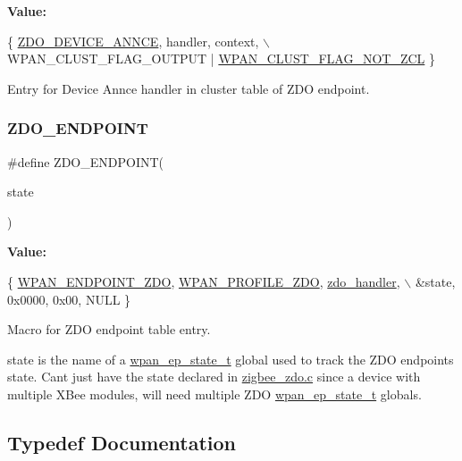 {\bfseries Value\+:}
\begin{DoxyCode}
\{ \hyperlink{group__zdo_gaffd566d5fc7aa21973fd7e5e026db30a}{ZDO\_DEVICE\_ANNCE}, handler, context, \(\backslash\)
                     WPAN\_CLUST\_FLAG\_OUTPUT | \hyperlink{group__wpan__aps_gacb0e365a8c5e72ee90be503513e7e630}{WPAN\_CLUST\_FLAG\_NOT\_ZCL} \}
\end{DoxyCode}


Entry for Device Annce handler in cluster table of Z\+DO endpoint. 

\mbox{\label{group__zdo_gaef7118e478f5ad9949dcd23f6e0901c9}} 
\subsubsection{\texorpdfstring{Z\+D\+O\+\_\+\+E\+N\+D\+P\+O\+I\+NT}{ZDO\_ENDPOINT}}
{\footnotesize\ttfamily \#define Z\+D\+O\+\_\+\+E\+N\+D\+P\+O\+I\+NT(\begin{DoxyParamCaption}\item[{}]{state }\end{DoxyParamCaption})}

{\bfseries Value\+:}
\begin{DoxyCode}
\{ \hyperlink{group__wpan__aps_ga860a08927c4e6d7656281713186c43dd}{WPAN\_ENDPOINT\_ZDO}, \hyperlink{group__wpan__aps_gabdbce33bdd976b65877a241842b73a20}{WPAN\_PROFILE\_ZDO}, 
      \hyperlink{group__zdo_ga2e4465da8204d6c9a67edc3a6f210c1d}{zdo\_handler},       \(\backslash\)
      &state, 0x0000, 0x00, NULL \}
\end{DoxyCode}


Macro for Z\+DO endpoint table entry. 

{\ttfamily state} is the name of a \hyperlink{structwpan__ep__state__t}{wpan\+\_\+ep\+\_\+state\+\_\+t} global used to track the Z\+DO endpoint\textquotesingle{}s state. Can\textquotesingle{}t just have the state declared in \hyperlink{zigbee__zdo_8c}{zigbee\+\_\+zdo.\+c} since a device with multiple X\+Bee modules, will need multiple Z\+DO \hyperlink{structwpan__ep__state__t}{wpan\+\_\+ep\+\_\+state\+\_\+t} globals. 

\subsection{Typedef Documentation}
\mbox{\label{group__zdo_ga54a6580e6f7572ca6014963d3e03e735}} 

